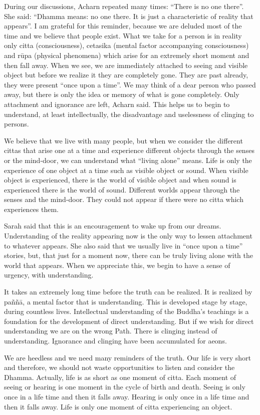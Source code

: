 During our discussions, Acharn repeated many times: ``There is no one
there''. She said: ``Dhamma means: no one there. It is just a
characteristic of reality that appears''. I am grateful for this
reminder, because we are deluded most of the time and we believe that
people exist. What we take for a person is in reality only citta
(consciousness), cetasika (mental factor accompanying consciousness) and
rūpa (physical phenomena) which arise for an extremely short moment and
then fall away. When we see, we are immediately attached to seeing and
visible object but before we realize it they are completely gone. They
are past already, they were present ``once upon a time''. We may think
of a dear person who passed away, but there is only the idea or memory
of what is gone completely. Only attachment and ignorance are left,
Acharn said. This helps us to begin to understand, at least
intellectually, the disadvantage and uselessness of clinging to persons.

We believe that we live with many people, but when we consider the
different cittas that arise one at a time and experience different
objects through the senses or the mind-door, we can understand what
``living alone'' means. Life is only the experience of one object at a
time such as visible object or sound. When visible object is
experienced, there is the world of visible object and when sound is
experienced there is the world of sound. Different worlds appear through
the senses and the mind-door. They could not appear if there were no
citta which experiences them.

Sarah said that this is an encouragement to wake up from our dreams.
Understanding of the reality appearing now is the only way to lessen
attachment to whatever appears. She also said that we usually live in
``once upon a time'' stories, but, that just for a moment now, there can
be truly living alone with the world that appears. When we appreciate
this, we begin to have a sense of urgency, with understanding.

It takes an extremely long time before the truth can be realized. It is
realized by paññā, a mental factor that is understanding. This is
developed stage by stage, during countless lives. Intellectual
understanding of the Buddha's teachings is a foundation for the
development of direct understanding. But if we wish for direct
understanding we are on the wrong Path. There is clinging instead of
understanding. Ignorance and clinging have been accumulated for aeons. 

We are heedless and we need many reminders of the truth. Our life is
very short and therefore, we should not waste opportunities to listen
and consider the Dhamma. Actually, life is as short as one moment of
citta. Each moment of seeing or hearing is one moment in the cycle of
birth and death. Seeing is only once in a life time and then it falls
away. Hearing is only once in a life time and then it falls away. Life
is only one moment of citta experiencing an object.

